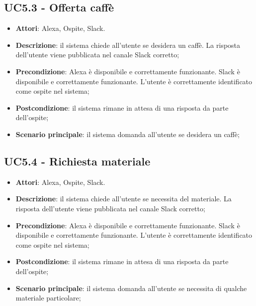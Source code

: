 \documentclass[../AnalisiDeiRequisiti_v4.0.0.tex]{subfiles}
\begin{document}
\subsection{UC5.3 - Offerta caffè} 
\label{sssec:UC5.3} 
\begin{itemize} 
\item \textbf{Attori}: Alexa, Ospite, Slack.
\item \textbf{Descrizione}: il sistema chiede all'utente se desidera un caffè. La risposta dell'utente viene pubblicata nel canale Slack corretto;
\item \textbf{Precondizione}: Alexa è disponibile e correttamente funzionante. Slack è disponibile e correttamente funzionante. L'utente è correttamente identificato come ospite nel sistema;
\item \textbf{Postcondizione}: il sistema rimane in attesa di una risposta da parte dell'ospite;
\item \textbf{Scenario principale}: il sistema domanda all'utente se desidera un caffè;
\end{itemize} 
\subsection{UC5.4 - Richiesta materiale} 
\label{sssec:UC5.4} 
\begin{itemize} 
\item \textbf{Attori}: Alexa, Ospite, Slack.
\item \textbf{Descrizione}: il sistema chiede all'utente se necessita del materiale. La risposta dell'utente viene pubblicata nel canale Slack corretto;
\item \textbf{Precondizione}: Alexa è disponibile e correttamente funzionante. Slack è disponibile e correttamente funzionante. L'utente è correttamente identificato come ospite nel sistema;
\item \textbf{Postcondizione}: il sistema rimane in attesa di una risposta da parte dell'ospite;
\item \textbf{Scenario principale}: il sistema domanda all'utente se necessita di qualche materiale particolare;
\end{itemize} 
\end{document}

